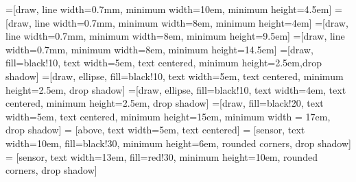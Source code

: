 \newcommand{\mx}[1]{\mathbf{\bm{#1}}} %
\newcommand{\vc}[1]{\mathbf{\bm{#1}}} %



=[draw, line width=0.7mm, minimum width=10em, minimum height=4.5em]
=[draw, line width=0.7mm, minimum width=8em, minimum height=4em]
=[draw, line width=0.7mm, minimum width=8em, minimum height=9.5em]
=[draw, line width=0.7mm, minimum width=8em, minimum height=14.5em]
=[draw, fill=black!10, text width=5em,
    text centered, minimum height=2.5em,drop shadow]
=[draw, ellipse, fill=black!10, text width=5em,
    text centered, minimum height=2.5em, drop shadow]
=[draw, ellipse, fill=black!10, text width=4em,
    text centered, minimum height=2.5em, drop shadow]
=[draw, fill=black!20, text width=5em,
    text centered, minimum height=15em, minimum width = 17em, drop shadow]
 = [above, text width=5em, text centered]
 = [sensor, text width=10em, fill=black!30,
    minimum height=6em, rounded corners, drop shadow]
 = [sensor, text width=13em, fill=red!30,
    minimum height=10em, rounded corners, drop shadow]


\def\blockdist{1.5}
\def\edgedist{2.5}

